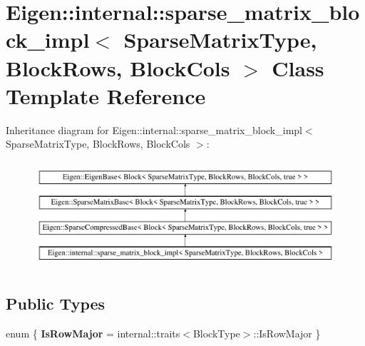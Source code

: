 \hypertarget{class_eigen_1_1internal_1_1sparse__matrix__block__impl}{}\section{Eigen\+::internal\+::sparse\+\_\+matrix\+\_\+block\+\_\+impl$<$ Sparse\+Matrix\+Type, Block\+Rows, Block\+Cols $>$ Class Template Reference}
\label{class_eigen_1_1internal_1_1sparse__matrix__block__impl}
Inheritance diagram for Eigen\+::internal\+::sparse\+\_\+matrix\+\_\+block\+\_\+impl$<$ Sparse\+Matrix\+Type, Block\+Rows, Block\+Cols $>$\+:\begin{figure}[H]
\begin{center}
\leavevmode
\includegraphics[height=4.000000cm]{class_eigen_1_1internal_1_1sparse__matrix__block__impl}
\end{center}
\end{figure}
\subsection*{Public Types}
\begin{DoxyCompactItemize}
\item 
\mbox{\label{class_eigen_1_1internal_1_1sparse__matrix__block__impl_a5ece33536612f6158e57b1ea4bde7cfc}} 
enum \{ {\bfseries Is\+Row\+Major} = internal\+::traits$<$Block\+Type$>$\+::Is\+Row\+Major
 \}
\end{DoxyCompactItemize}
